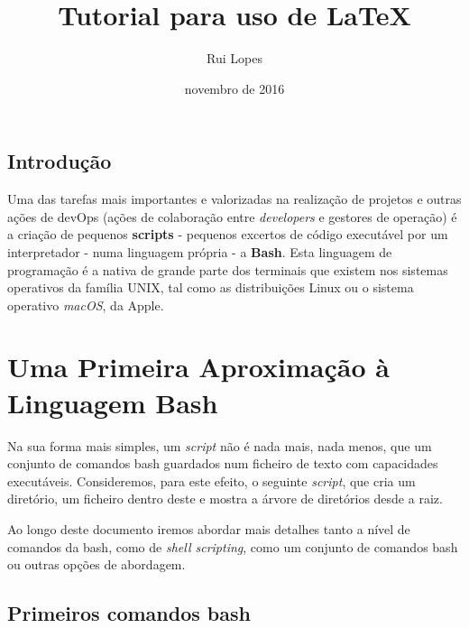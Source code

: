 \documentclass[a4paper, onecolumn, 10pt]{report}
\title{Tutorial para uso de \LaTeX}
\author{Rui Lopes}
\date{novembro de 2016}
\begin{document}
\maketitle

\section{Introdução}

Uma das tarefas mais importantes e valorizadas na realização de projetos e outras ações de devOps (ações de colaboração entre \textit{developers} e gestores de operação) é a criação de pequenos \textbf{scripts} - pequenos excertos de código executável por um interpretador - numa linguagem própria - a \textbf{Bash}. Esta linguagem de programação é a nativa de grande parte dos terminais que existem nos sistemas operativos da família UNIX, tal como as distribuições Linux ou o sistema operativo \textit{macOS}, da Apple.

\chapter{Uma Primeira Aproximação à Linguagem Bash}

Na sua forma mais simples, um \textit{script} não é nada mais, nada menos, que um conjunto de comandos bash guardados num ficheiro de texto com capacidades executáveis. Consideremos, para este efeito, o seguinte \textit{script}, que cria um diretório, um ficheiro dentro deste e mostra a árvore de diretórios desde a raiz.



Ao longo deste documento iremos abordar mais detalhes tanto a nível de comandos da bash, como de \textit{shell scripting}, como um conjunto de comandos bash ou outras opções de abordagem.

\section{Primeiros comandos bash}
\end{document}
